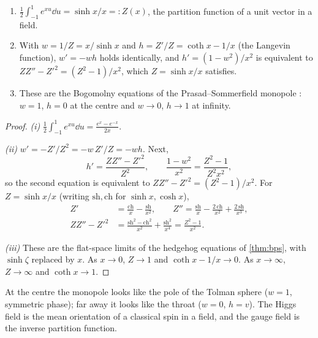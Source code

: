 \begin{proposition}\label{prop:langevin}\ver\
\begin{enumerate}[label=(\roman*)]
\item $\frac12\int_{-1}^1e^{xu}\dd u=\sinh x/x=:Z(x)$, the partition function of a unit vector in a field.
\item With $w=1/Z=x/\sinh x$ and $h=Z'/Z=\coth x-1/x$ (the Langevin function), $w'=-wh$ holds identically, and $h'=(1-w^2)/x^2$ is equivalent to $ZZ''-Z'^2=(Z^2-1)/x^2$, which $Z=\sinh x/x$ satisfies.
\item These are the Bogomolny equations of the Prasad--Sommerfield monopole \cite{PrasadSommerfield1975}: $w=1$, $h=0$ at the centre and $w\to0$, $h\to1$ at infinity.
\end{enumerate}
\end{proposition}
\begin{proof}
\emph{(i)} $\frac12\int_{-1}^1e^{xu}\dd u=\frac{e^x-e^{-x}}{2x}$.

\emph{(ii)} $w'=-Z'/Z^2=-w\,Z'/Z=-wh$. Next,
\[
h'=\frac{ZZ''-Z'^2}{Z^2},\qquad\frac{1-w^2}{x^2}=\frac{Z^2-1}{Z^2x^2},
\]
so the second equation is equivalent to $ZZ''-Z'^2=(Z^2-1)/x^2$. For $Z=\sinh x/x$ (writing $\mathrm{sh},\mathrm{ch}$ for $\sinh x,\cosh x$),
\begin{align*}
Z'&=\frac{\mathrm{ch}}x-\frac{\mathrm{sh}}{x^2},\qquad Z''=\frac{\mathrm{sh}}x-\frac{2\,\mathrm{ch}}{x^2}+\frac{2\,\mathrm{sh}}{x^3},\\
ZZ''-Z'^2&=\frac{\mathrm{sh}^2-\mathrm{ch}^2}{x^2}+\frac{\mathrm{sh}^2}{x^4}=\frac{Z^2-1}{x^2}.
\end{align*}

\emph{(iii)} These are the flat-space limits of the hedgehog equations of \cref{thm:bps}, with $\sinh\zeta$ replaced by $x$. As $x\to0$, $Z\to1$ and $\coth x-1/x\to0$. As $x\to\infty$, $Z\to\infty$ and $\coth x\to1$.
\end{proof}


At the centre the monopole looks like the pole of the Tolman sphere ($w=1$, symmetric phase); far away it looks like the throat ($w=0$, $h=v$). The Higgs field is the mean orientation of a classical spin in a field, and the gauge field is the inverse partition function.

